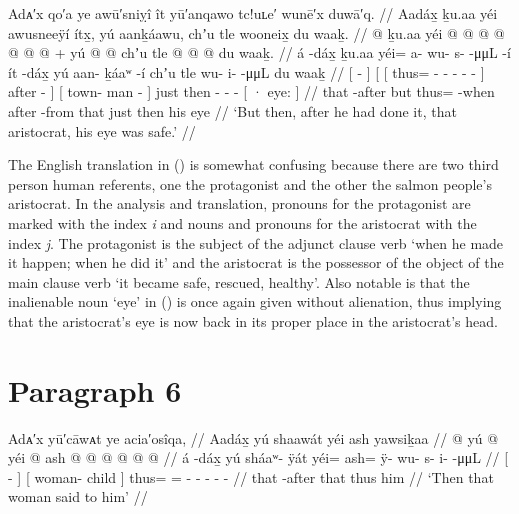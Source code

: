 \ex\label{ex:100-80-fixed-and-safe}%
%
\begingl
	\glpreamble	Adᴀ′x qo′a ye awū′sniỵî ît yū′anqawo tc!uʟe′ wunē′x duwā′q. //
	\glpreamble	Aadáx̱ ḵu.aa yéi awusneeÿí ítx̱, yú aanḵáawu, chʼu tle wooneix̱ du waaḵ. //
	\gla	{}  @ {} {} ḵu.aa 
		{} {} yéi @  @ {} @ {} @ {} @ {} @ {} {} 
			 @ {} {} +
		{} yú  @ {} @ {} {} 
		chʼu tle  @ {} @ {} @ {}
		{} du waaḵ. {} //
	\glb	{} á -dáx̱ {} ḵu.aa 
		{} {} yéi= a- wu- s-  -μμL -í {} 
			ít -dáx̱ {} 
		{} yú aan- ḵáaʷ -í {} 
		chʼu tle wu- i-  -μμL
		{} du waaḵ {} //
	\glc	{}[  - {}] 
		{}[ {}[ thus= - - -  - - {}]
				after - {}]
		{}[  town- man - {}]
		just then - -  -
		{}[ · eye: {}] //
	\gld	{} that -after {} but
		{} {} thus=  {} {} {} {} -when {} after -from {}
		{} that  {} {} {}
		just then  {} {} {}
		{} his eye {} //
	\glft	‘But then, after he had done it, that aristocrat, his eye was safe.’
		//
\endgl
\xe

The English translation in (\lastx) is somewhat confusing because there are two third person human referents, one the protagonist and the other the salmon people’s aristocrat.
In the analysis and translation, pronouns for the protagonist are marked with the index \textit{i} and nouns and pronouns for the aristocrat with the index \textit{j}.
The protagonist is the subject of the adjunct clause verb  ‘when he made it happen; when he did it’ and the aristocrat is the possessor of the object of the main clause verb  ‘it became safe, rescued, healthy’.
Also notable is that the inalienable noun  ‘eye’ in (\lastx) is once again given without alienation, thus implying that the aristocrat’s eye is now back in its proper place in the aristocrat’s head.

\section{Paragraph 6}\label{sec:100-para-6}

\ex\label{ex:100-81-that-woman-said}%
%
\begingl
	\glpreamble	Adᴀ′x yū′cāwᴀt ye acia′osîqa, //
	\glpreamble	Aadáx̱ yú shaawát yéi ash yawsiḵaa //
	\gla	{}  @ {} {} 
		{} yú  @ {} {} 
		yéi @ ash @  @ {} @ {} @ {} @ {} @ {} //
	\glb	{} á -dáx̱ {} 
		{} yú sháaʷ- ÿát {} 
		yéi= ash= ÿ- wu- s- i-  -μμL //
	\glc	{}[  - {}]
		{}[  woman- child {}]
		thus= = - - - -  - //
	\gld	{} that -after {} 
		{} that  {} {} 
		thus him  {} {} {} {} {} //
	\glft	‘Then that woman said to him’
		//
\endgl
\xe

